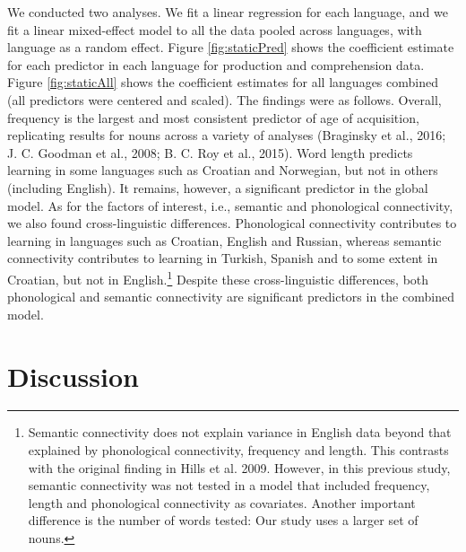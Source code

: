 \documentclass[english,floatsintext,man]{apa6}
\theoremstyle{definition}
\theoremstyle{definition}
\theoremstyle{definition}
\theoremstyle{remark}
\begin{document}
We conducted two analyses. We fit a linear regression for each language,
and we fit a linear mixed-effect model to all the data pooled across
languages, with language as a random effect. Figure \ref{fig:staticPred}
shows the coefficient estimate for each predictor in each language for
production and comprehension data. Figure \ref{fig:staticAll} shows the
coefficient estimates for all languages combined (all predictors were
centered and scaled). The findings were as follows. Overall, frequency
is the largest and most consistent predictor of age of acquisition,
replicating results for nouns across a variety of analyses (Braginsky et
al., 2016; J. C. Goodman et al., 2008; B. C. Roy et al., 2015). Word
length predicts learning in some languages such as Croatian and
Norwegian, but not in others (including English). It remains, however, a
significant predictor in the global model. As for the factors of
interest, i.e., semantic and phonological connectivity, we also found
cross-linguistic differences. Phonological connectivity contributes to
learning in languages such as Croatian, English and Russian, whereas
semantic connectivity contributes to learning in Turkish, Spanish and to
some extent in Croatian, but not in
English.\footnote{Semantic connectivity does not explain variance in English data beyond that explained by phonological connectivity, frequency and length. This contrasts with the original finding in Hills et al. 2009. However, in this previous study, semantic connectivity was not tested in a model that included frequency, length and phonological connectivity as covariates. Another important difference is the number of words tested: Our study uses a larger set of nouns.}
Despite these cross-linguistic differences, both phonological and
semantic connectivity are significant predictors in the combined model.

\section{Discussion}\label{discussion}
\end{document}
